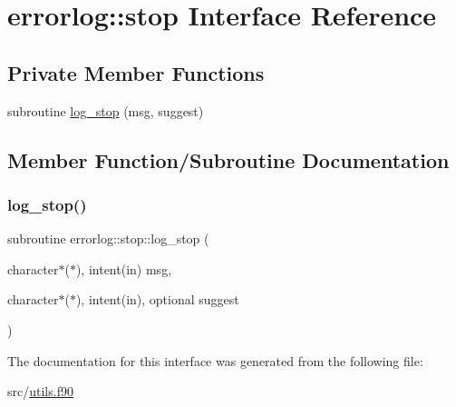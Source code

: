 \hypertarget{interfaceerrorlog_1_1stop}{}\section{errorlog\+:\+:stop Interface Reference}
\label{interfaceerrorlog_1_1stop}
\subsection*{Private Member Functions}
\begin{DoxyCompactItemize}
\item 
subroutine \hyperlink{interfaceerrorlog_1_1stop_ac31af7865263e7e2809c05d39004e49c}{log\+\_\+stop} (msg, suggest)
\end{DoxyCompactItemize}


\subsection{Member Function/\+Subroutine Documentation}
\mbox{\label{interfaceerrorlog_1_1stop_ac31af7865263e7e2809c05d39004e49c}} 
\subsubsection{\texorpdfstring{log\+\_\+stop()}{log\_stop()}}
{\footnotesize\ttfamily subroutine errorlog\+::stop\+::log\+\_\+stop (\begin{DoxyParamCaption}\item[{character$\ast$($\ast$), intent(in)}]{msg,  }\item[{character$\ast$($\ast$), intent(in), optional}]{suggest }\end{DoxyParamCaption})\hspace{0.3cm}{\ttfamily [private]}}



The documentation for this interface was generated from the following file\+:\begin{DoxyCompactItemize}
\item 
src/\hyperlink{utils_8f90}{utils.\+f90}\end{DoxyCompactItemize}
